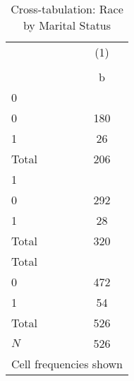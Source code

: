 \begin{table}[htbp]\centering
\def\sym#1{\ifmmode^{#1}\else\(^{#1}\)\fi}
\caption{Cross-tabulation: Race by Marital Status}
\begin{tabular}{l*{1}{c}}
\toprule
            &\multicolumn{1}{c}{(1)}\\
            &\multicolumn{1}{c}{}\\
            &           b\\
\midrule
0           &            \\
0           &         180\\
1           &          26\\
Total       &         206\\
\midrule
1           &            \\
0           &         292\\
1           &          28\\
Total       &         320\\
\midrule
Total       &            \\
0           &         472\\
1           &          54\\
Total       &         526\\
\midrule
\(N\)       &         526\\
\bottomrule
\multicolumn{2}{l}{\footnotesize Cell frequencies shown}\\
\end{tabular}
\end{table}
